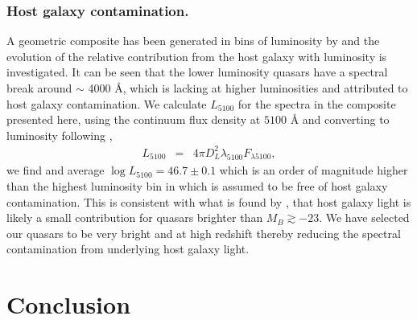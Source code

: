 \documentclass{aa}    %
\newcommand{\eqlabel}[1]{\label{eq:#1}}
\newcommand{\sectlabel}[1]{\label{sect:#1}}
\begin{document}
 
 \subsubsection{Host galaxy contamination.}  \sectlabel{Host galaxy
contamination}

A geometric composite has been generated in bins of luminosity by
\citet{Shen2011} and the evolution of the relative contribution from the host
galaxy with luminosity is investigated. It can be seen that the lower luminosity
quasars have a spectral break around $\sim$ 4000 \AA, which is lacking at higher
luminosities and attributed to host galaxy contamination. We calculate
$L_{5100}$ for the spectra in the composite presented here, using the continuum
flux density at $5100$ {\AA} and converting to luminosity following
\cite{Netzer2007},
\begin{eqnarray}\eqlabel{l5100}
L_{5100} &=&    4 \pi D_{L} ^{2} \lambda_{5100}  F_{\lambda5100},
\end{eqnarray}
we find and average $\log L_{5100} = 46.7 \pm 0.1$ which is an order of
magnitude higher than the highest luminosity bin in \cite{Shen2011} which is
assumed to be free of host galaxy contamination. This is consistent with what is
found by \citet{Hopkins2007}, that host galaxy light is likely a small
contribution for quasars brighter than $M_{B} \gtrsim -23$. We have selected our
quasars to be very bright and at high redshift thereby reducing the spectral
contamination from underlying host galaxy light. 





\section{Conclusion}  \sectlabel{conclusion}
\end{document}
